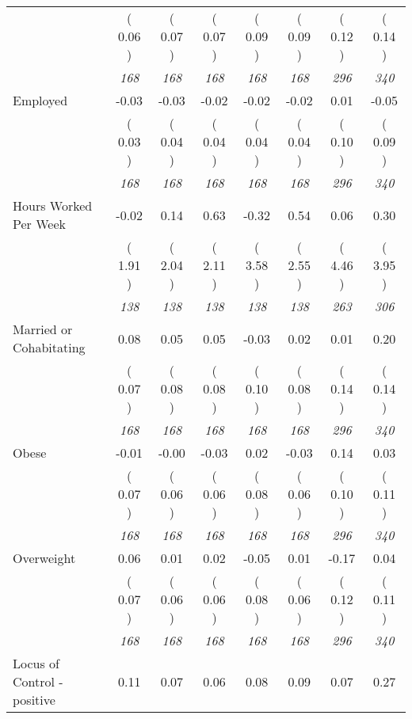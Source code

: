 \begin{tabular}{l c c c c c c c}
& (     0.06 ) & (     0.07 ) & (     0.07 ) & (     0.09 ) & (     0.09 ) & (     0.12 ) & (     0.14 ) \\
& \textit{ 168 } & \textit{ 168 } & \textit{ 168 } & \textit{ 168 } & \textit{ 168 } & \textit{ 296 } & \textit{ 340 } \\
Employed &     -0.03 &     -0.03 &     -0.02 &     -0.02 &     -0.02 &      0.01 &     -0.05 \\
& (     0.03 ) & (     0.04 ) & (     0.04 ) & (     0.04 ) & (     0.04 ) & (     0.10 ) & (     0.09 ) \\
& \textit{ 168 } & \textit{ 168 } & \textit{ 168 } & \textit{ 168 } & \textit{ 168 } & \textit{ 296 } & \textit{ 340 } \\
Hours Worked Per Week &     -0.02 &      0.14 &      0.63 &     -0.32 &      0.54 &      0.06 &      0.30 \\
& (     1.91 ) & (     2.04 ) & (     2.11 ) & (     3.58 ) & (     2.55 ) & (     4.46 ) & (     3.95 ) \\
& \textit{ 138 } & \textit{ 138 } & \textit{ 138 } & \textit{ 138 } & \textit{ 138 } & \textit{ 263 } & \textit{ 306 } \\
Married or Cohabitating &      0.08 &      0.05 &      0.05 &     -0.03 &      0.02 &      0.01 &      0.20 \\
& (     0.07 ) & (     0.08 ) & (     0.08 ) & (     0.10 ) & (     0.08 ) & (     0.14 ) & (     0.14 ) \\
& \textit{ 168 } & \textit{ 168 } & \textit{ 168 } & \textit{ 168 } & \textit{ 168 } & \textit{ 296 } & \textit{ 340 } \\
Obese &     -0.01 &     -0.00 &     -0.03 &      0.02 &     -0.03 &      0.14 &      0.03 \\
& (     0.07 ) & (     0.06 ) & (     0.06 ) & (     0.08 ) & (     0.06 ) & (     0.10 ) & (     0.11 ) \\
& \textit{ 168 } & \textit{ 168 } & \textit{ 168 } & \textit{ 168 } & \textit{ 168 } & \textit{ 296 } & \textit{ 340 } \\
Overweight &      0.06 &      0.01 &      0.02 &     -0.05 &      0.01 &     -0.17 &      0.04 \\
& (     0.07 ) & (     0.06 ) & (     0.06 ) & (     0.08 ) & (     0.06 ) & (     0.12 ) & (     0.11 ) \\
& \textit{ 168 } & \textit{ 168 } & \textit{ 168 } & \textit{ 168 } & \textit{ 168 } & \textit{ 296 } & \textit{ 340 } \\
Locus of Control - positive &      0.11 &      0.07 &      0.06 &      0.08 &      0.09 &      0.07 &      0.27 \\

\end{tabular}

